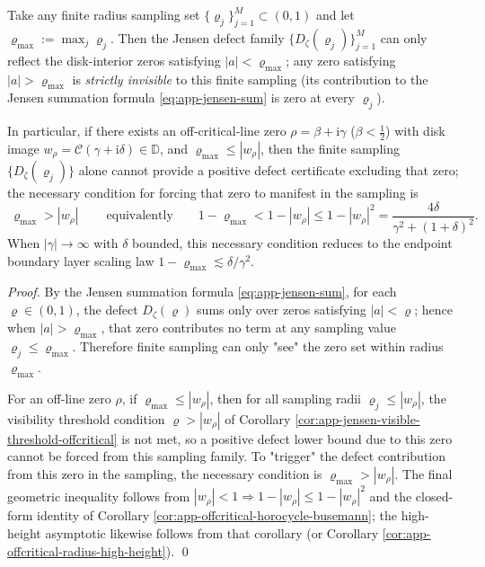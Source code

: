 \begin{corollary}\label{cor:app-jensen-finite-sampling-blindspot}
Take any finite radius sampling set \(\{\varrho_j\}_{j=1}^{M}\subset(0,1)\) and let \(\varrho_{\max}:=\max_j\varrho_j\).
Then the Jensen defect family \(\{D_{\zeta}(\varrho_j)\}_{j=1}^{M}\) can only reflect the disk-interior zeros satisfying \(|a|<\varrho_{\max}\); any zero satisfying \(|a|>\varrho_{\max}\) is \emph{strictly invisible} to this finite sampling (its contribution to the Jensen summation formula \eqref{eq:app-jensen-sum} is zero at every \(\varrho_j\)).
\par
In particular, if there exists an off-critical-line zero \(\rho=\beta+\mathrm{i}\gamma\) (\(\beta<\tfrac12\)) with disk image \(w_{\rho}=\mathcal{C}(\gamma+\mathrm{i}\delta)\in\mathbb{D}\), and \(\varrho_{\max}\le |w_{\rho}|\), then the finite sampling \(\{D_{\zeta}(\varrho_j)\}\) alone cannot provide a positive defect certificate excluding that zero; the necessary condition for forcing that zero to manifest in the sampling is
\[
\boxed{\ \varrho_{\max}>|w_{\rho}|\ }\qquad\text{equivalently}\qquad
1-\varrho_{\max}<1-|w_{\rho}|
\le 1-|w_{\rho}|^{2}
=\frac{4\delta}{\gamma^{2}+(1+\delta)^{2}}.
\]
When \(|\gamma|\to\infty\) with \(\delta\) bounded, this necessary condition reduces to the endpoint boundary layer scaling law \(1-\varrho_{\max}\lesssim \delta/\gamma^{2}\).
\end{corollary}

\begin{proof}
By the Jensen summation formula \eqref{eq:app-jensen-sum}, for each \(\varrho\in(0,1)\), the defect \(D_{\zeta}(\varrho)\) sums only over zeros satisfying \(|a|<\varrho\); hence when \(|a|>\varrho_{\max}\), that zero contributes no term at any sampling value \(\varrho_j\le\varrho_{\max}\).
Therefore finite sampling can only "see" the zero set within radius \(\varrho_{\max}\).
\par
For an off-line zero \(\rho\), if \(\varrho_{\max}\le |w_{\rho}|\), then for all sampling radii \(\varrho_j\le |w_{\rho}|\), the visibility threshold condition \(\varrho>|w_{\rho}|\) of Corollary \ref{cor:app-jensen-visible-threshold-offcritical} is not met, so a positive defect lower bound due to this zero cannot be forced from this sampling family.
To "trigger" the defect contribution from this zero in the sampling, the necessary condition is \(\varrho_{\max}>|w_{\rho}|\).
The final geometric inequality follows from \(|w_{\rho}|<1\Rightarrow 1-|w_{\rho}|\le 1-|w_{\rho}|^{2}\) and the closed-form identity of Corollary \ref{cor:app-offcritical-horocycle-busemann}; the high-height asymptotic likewise follows from that corollary (or Corollary \ref{cor:app-offcritical-radius-high-height}). \qed
\end{proof}

